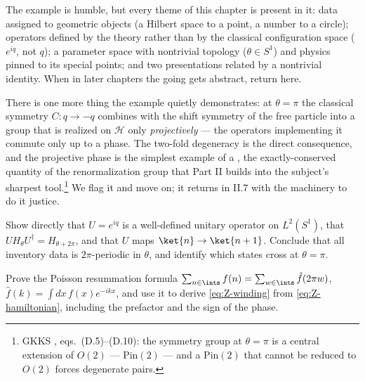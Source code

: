 The example is humble, but every theme of this chapter is present in it: data
assigned to geometric objects (a Hilbert space to a point, a number to a
circle); operators defined by the theory rather than by the classical
configuration space ($e^{iq}$, not $q$); a parameter space with nontrivial
topology ($\theta \in S^1$) and physics pinned to its special points; and two
presentations related by a nontrivial identity. When in later chapters the going
gets abstract, return here.

There is one more thing the example quietly demonstrates: at $\theta = \pi$ the
classical symmetry $C: q \to -q$ combines with the shift symmetry of the free
particle into a group that is realized on $\mathcal{H}$ only \emph{projectively}
--- the operators implementing it commute only up to a phase. The two-fold
degeneracy is the direct consequence, and the projective phase is the simplest
example of a , the exactly-conserved quantity of the
renormalization group that Part II builds into the subject's sharpest
tool.\footnote{GKKS , eqs.\ (D.5)--(D.10): the symmetry group
at $\theta=\pi$ is a central extension of $O(2)$ --- $\mathrm{Pin}(2)$ --- and a
$\mathrm{Pin}(2)$ that cannot be reduced to $O(2)$ forces degenerate pairs.} We
flag it and move on; it returns in II.7 with the machinery to do it justice.

\begin{exercise}[easy]
\label{exr:theta-periodicity}
Show directly that $U = e^{iq}$ is a well-defined unitary operator on
$L^2(S^1)$, that $U H_\theta U^\dagger = H_{\theta + 2\pi}$, and that $U$ maps
$\ket{n} \to \ket{n+1}$. Conclude that all inventory data is $2\pi$-periodic in
$\theta$, and identify which states cross at $\theta = \pi$.
\end{exercise}

\begin{exercise}[classic]
\label{exr:poisson}
Prove the Poisson resummation formula $\sum_{n \in \ints} f(n) =
\sum_{w\in\ints} \hat f(2\pi w)$, $\hat f(k) = \int dx\, f(x) e^{-ikx}$, and use
it to derive \eqref{eq:Z-winding} from \eqref{eq:Z-hamiltonian}, including the
prefactor and the sign of the phase.
\end{exercise}

